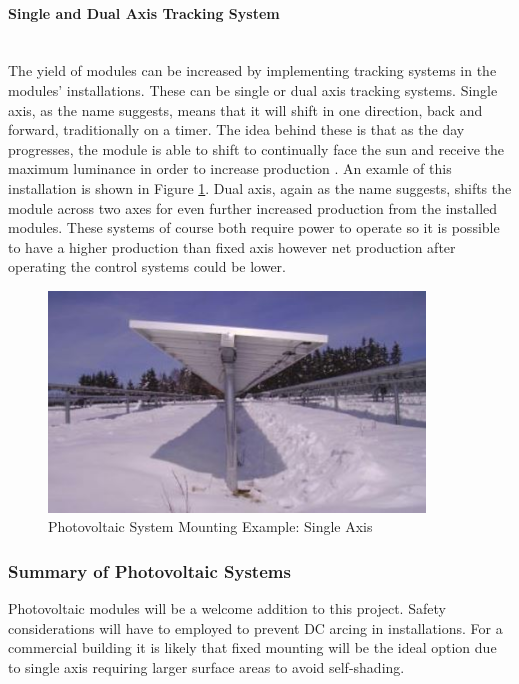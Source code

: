 \paragraph{Single and Dual Axis Tracking System}
~\\
The yield of modules can be increased by implementing tracking systems in the modules' installations. These can be single or dual axis tracking systems. Single axis, as the name suggests, means that it will shift in one direction, back and forward, traditionally on a timer. The idea behind these is that as the day progresses, the module is able to shift to continually face the sun and receive the maximum luminance in order to increase production \cite{Haberlin2012}. An examle of this installation is shown in Figure \ref{fig:pv-mounting-single-axis}. Dual axis, again as the name suggests, shifts the module across two axes for even further increased production from the installed modules. These systems of course both require power to operate so it is possible to have a higher production than fixed axis however net production after operating the control systems could be lower.  

\begin{figure}[H]
	\hfill\includegraphics[width = 100mm]{images/pv-mouting-rotating}\hspace*{\fill}
	\caption{Photovoltaic System Mounting Example: Single Axis \cite{Haberlin2012}} 
	\label{fig:pv-mounting-single-axis}
\end{figure} 

\subsubsection{Summary of Photovoltaic Systems}

Photovoltaic modules will be a welcome addition to this project. Safety considerations will have to employed to prevent DC arcing in installations. For a commercial building it is likely that fixed mounting will be the ideal option due to single axis requiring larger surface areas to avoid self-shading. 

